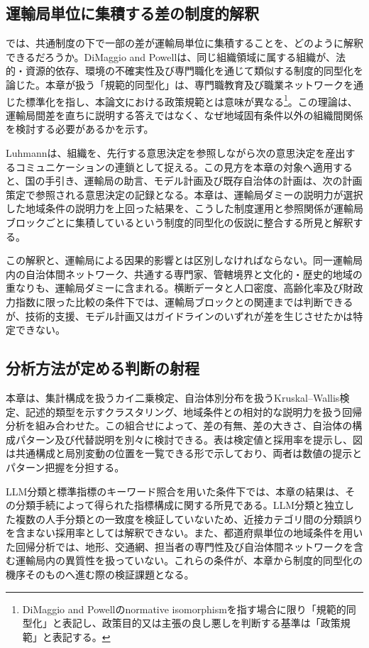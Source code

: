 \subsection{運輸局単位に集積する差の制度的解釈}

では、共通制度の下で一部の差が運輸局単位に集積することを、どのように解釈できるだろうか。DiMaggio and Powell\cite{dimaggio1983iron}は、同じ組織領域に属する組織が、法的・資源的依存、環境の不確実性及び専門職化を通じて類似する制度的同型化を論じた。本章が扱う「規範的同型化」は、専門職教育及び職業ネットワークを通じた標準化を指し、本論文における政策規範とは意味が異なる\footnote{DiMaggio and Powellのnormative isomorphismを指す場合に限り「規範的同型化」と表記し、政策目的又は主張の良し悪しを判断する基準は「政策規範」と表記する。}。この理論は、運輸局間差を直ちに説明する答えではなく、なぜ地域固有条件以外の組織間関係を検討する必要があるかを示す。

Luhmann\cite{luhmann2000organisation}は、組織を、先行する意思決定を参照しながら次の意思決定を産出するコミュニケーションの連鎖として捉える。この見方を本章の対象へ適用すると、国の手引き、運輸局の助言、モデル計画及び既存自治体の計画は、次の計画策定で参照される意思決定の記録となる。本章は、運輸局ダミーの説明力が選択した地域条件の説明力を上回った結果を、こうした制度運用と参照関係が運輸局ブロックごとに集積しているという制度的同型化の仮説に整合する所見と解釈する。

この解釈と、運輸局による因果的影響とは区別しなければならない。同一運輸局内の自治体間ネットワーク、共通する専門家、管轄境界と文化的・歴史的地域の重なりも、運輸局ダミーに含まれる。横断データと人口密度、高齢化率及び財政力指数に限った比較の条件下では、運輸局ブロックとの関連までは判断できるが、技術的支援、モデル計画又はガイドラインのいずれが差を生じさせたかは特定できない。

\subsection{分析方法が定める判断の射程}

本章は、集計構成を扱うカイ二乗検定、自治体別分布を扱うKruskal--Wallis検定、記述的類型を示すクラスタリング、地域条件との相対的な説明力を扱う回帰分析を組み合わせた。この組合せによって、差の有無、差の大きさ、自治体の構成パターン及び代替説明を別々に検討できる。表は検定値と採用率を提示し、図は共通構成と局別変動の位置を一覧できる形で示しており、両者は数値の提示とパターン把握を分担する。

LLM分類と標準指標のキーワード照合を用いた条件下では、本章の結果は、その分類手続によって得られた指標構成に関する所見である。LLM分類と独立した複数の人手分類との一致度を検証していないため、近接カテゴリ間の分類誤りを含まない採用率としては解釈できない。また、都道府県単位の地域条件を用いた回帰分析では、地形、交通網、担当者の専門性及び自治体間ネットワークを含む運輸局内の異質性を扱っていない。これらの条件が、本章から制度的同型化の機序そのものへ進む際の検証課題となる。

